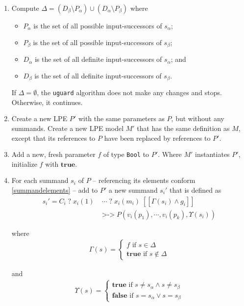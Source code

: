 \begin{enumerate}
\item Compute $\Delta = (D_\beta \setminus P_\alpha) \cup (D_\alpha \setminus P_\beta)$ where
\begin{itemize}
\item $P_\alpha$ is the set of all possible input-successors of $s_\alpha$;
\item $P_\beta$ is the set of all possible input-successors of $s_\beta$;
\item $D_\alpha$ is the set of all definite input-successors of $s_\alpha$; and
\item $D_\beta$ is the set of all definite input-successors of $s_\beta$.
\end{itemize}

If $\Delta = \emptyset{}$, the \texttt{uguard} algorithm does not make any changes and stops.
Otherwise, it continues.

\item Create a new LPE $P'$ with the same parameters as $P$, but without any summands.
Create a new LPE model $M'$ that has the same definition as $M$, except that its references to $P$ have been replaced by references to $P'$.

\item Add a new, fresh parameter $f$ of type \texttt{Bool} to $P'$.
Where $M'$ instantiates $P'$, initialize $f$ with $\textbf{true}$.

\item For each summand $s_i$ of $P$ -- referencing its elements conform \ref{summandelements} -- add to $P'$ a new summand ${s_i}'$ that is defined as
\begin{align*}
{s_i}' = C_i \; \texttt{?} \; x_i(1) \; &\cdots{} \; \texttt{?} \; x_i(m_i) \; [[\Gamma(s_i) \land g_i]] \\
&\texttt{>->} \; P(v_i(p_1), \cdots{}, v_i(p_k), \Upsilon(s_i))
\end{align*}

where
\begin{align*}
\Gamma(s) = \begin{cases}
f \text{ if } s \in \Delta \\
\textbf{true} \text{ if } s \notin \Delta
\end{cases}
\end{align*}

and
\begin{align*}
\Upsilon(s) = \begin{cases}
\textbf{true} \text{ if } s \neq s_\alpha \land s \neq s_\beta \\
\textbf{false} \text{ if } s = s_\alpha \lor s = s_\beta
\end{cases}
\end{align*}
\end{enumerate}

